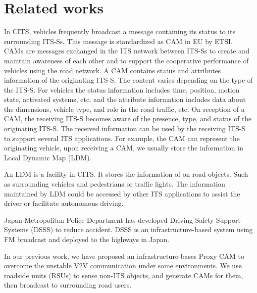 \section{Related works} \label{sec:related_works}

In CITS, vehicles frequently broadcast a message containing its status to its surrounding ITS-Ss.
This message is standardized as CAM  in EU by ETSI.
CAMs are messages exchanged in the ITS network between ITS-Ss to create and maintain awareness of each other
and to support the cooperative performance of vehicles using the road network.
A CAM contains status and attributes information of the originating ITS-S.
The content varies depending on the type of the ITS-S.
For vehicles the status information includes time, position, motion state, activated systems,
etc. and the attribute information includes data about the dimensions,
vehicle type, and role in the road traffic, etc.
On reception of a CAM, the receiving ITS-S becomes aware of the presence, type, and status of the originating ITS-S.
The received information can be used by the receiving ITS-S to support several ITS applications.
For example, the CAM can represent the originating vehicle, upon receiving a CAM,
we usually store the information in Local Dynamic Map (LDM).

An LDM is a facility in CITS.
It stores the information of on road objects.
Such as surrounding vehicles and pedestrians or traffic lights.
The information maintained by LDM could be accessed by other ITS applications to assist the driver or facilitate autonomous driving.

Japan Metropolitan Police Department has developed Driving Safety Support Systems (DSSS) to reduce accident.
DSSS is an infrastructure-based system using FM broadcast and deployed to the highways in Japan.

In our previous work, we have proposed an infrastructure-bases Proxy CAM to overcome the unstable V2V communication under some environments.
We use roadside units (RSUs) to sense non-ITS objects, and generate CAMs for them, then broadcast to surrounding road users.
